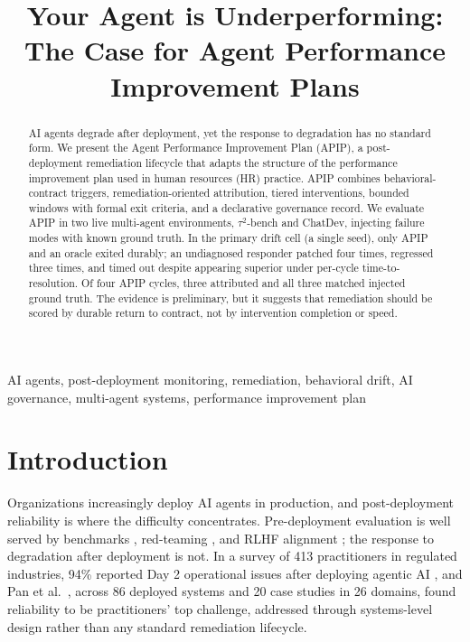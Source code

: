 \documentclass[conference]{IEEEtran}
\begin{document}
\title{Your Agent is Underperforming:\\ The Case for Agent Performance Improvement Plans}

\author{
}

\maketitle

\begin{abstract}
AI agents degrade after deployment, yet the response to degradation has no standard form. We present the Agent Performance Improvement Plan (APIP), a post-deployment remediation lifecycle that adapts the structure of the performance improvement plan used in human resources (HR) practice. APIP combines behavioral-contract triggers, remediation-oriented attribution, tiered interventions, bounded windows with formal exit criteria, and a declarative governance record. We evaluate APIP in two live multi-agent environments, $\tau^2$-bench and ChatDev, injecting failure modes with known ground truth. In the primary drift cell (a single seed), only APIP and an oracle exited durably; an undiagnosed responder patched four times, regressed three times, and timed out despite appearing superior under per-cycle time-to-resolution. Of four APIP cycles, three attributed and all three matched injected ground truth. The evidence is preliminary, but it suggests that remediation should be scored by durable return to contract, not by intervention completion or speed.
\end{abstract}

\begin{IEEEkeywords}
AI agents, post-deployment monitoring, remediation, behavioral drift, AI governance, multi-agent systems, performance improvement plan
\end{IEEEkeywords}

\section{Introduction}

Organizations increasingly deploy AI agents in production, and post-deployment reliability is where the difficulty concentrates. Pre-deployment evaluation is well served by benchmarks \cite{ref1}, red-teaming \cite{ref2}, and RLHF alignment \cite{ref3}; the response to degradation after deployment is not. In a survey of 413 practitioners in regulated industries, 94\% reported Day 2 operational issues after deploying agentic AI \cite{ref4}, and Pan et al.~\cite{ref5}, across 86 deployed systems and 20 case studies in 26 domains, found reliability to be practitioners' top challenge, addressed through systems-level design rather than any standard remediation lifecycle.
\end{document}
